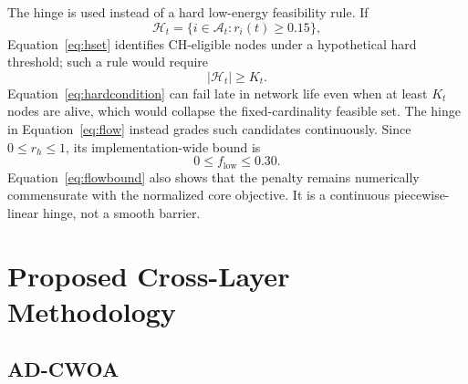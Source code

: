 \documentclass[pdflatex,sn-mathphys-num]{sn-jnl}
\begin{document}
The hinge is used instead of a hard low-energy feasibility rule. If
\begin{equation}
\mathcal{H}_t=\{i\in\mathcal{A}_t:r_i(t)\ge0.15\},
\label{eq:hset}
\end{equation}
Equation~\eqref{eq:hset} identifies CH-eligible nodes under a hypothetical hard threshold; such a rule would require
\begin{equation}
|\mathcal{H}_t|\ge K_t.
\label{eq:hardcondition}
\end{equation}
Equation~\eqref{eq:hardcondition} can fail late in network life even when at least $K_t$ nodes are alive, which would collapse the fixed-cardinality feasible set. The hinge in Equation~\eqref{eq:flow} instead grades such candidates continuously. Since $0\le r_h\le1$, its implementation-wide bound is
\begin{equation}
0\le f_{\mathrm{low}}\le0.30.
\label{eq:flowbound}
\end{equation}
Equation~\eqref{eq:flowbound} also shows that the penalty remains numerically commensurate with the normalized core objective. It is a continuous piecewise-linear hinge, not a smooth barrier.

\section{Proposed Cross-Layer Methodology}

\subsection{AD-CWOA}
\end{document}
